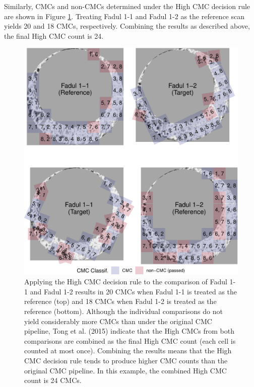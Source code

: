 Similarly, CMCs and non-CMCs determined under the High CMC decision rule are shown in Figure \ref{fig:highCMCPlot}.
Treating Fadul 1-1 and Fadul 1-2 as the reference scan yields 20 and 18 CMCs, respectively.
Combining the results as described above, the final High CMC count is 24.

\begin{figure}[htbp]

{\centering \includegraphics[width=\textwidth]{figures/kmHighCMC} 

}

\caption{Applying the High CMC decision rule to the comparison of Fadul 1-1 and Fadul 1-2 results in 20 CMCs when Fadul 1-1 is treated as the reference (top) and 18 CMCs when Fadul 1-2 is treated as the reference (bottom). Although the individual comparisons do not yield considerably more CMCs than under the original CMC pipeline, Tong et al. (2015) indicate that the High CMCs from both comparisons are combined as the final High CMC count (each cell is counted at most once). Combining the results means that the High CMC decision rule tends to produce higher CMC counts than the original CMC pipeline. In this example, the combined High CMC count is 24 CMCs.}\label{fig:highCMCPlot}
\end{figure}

